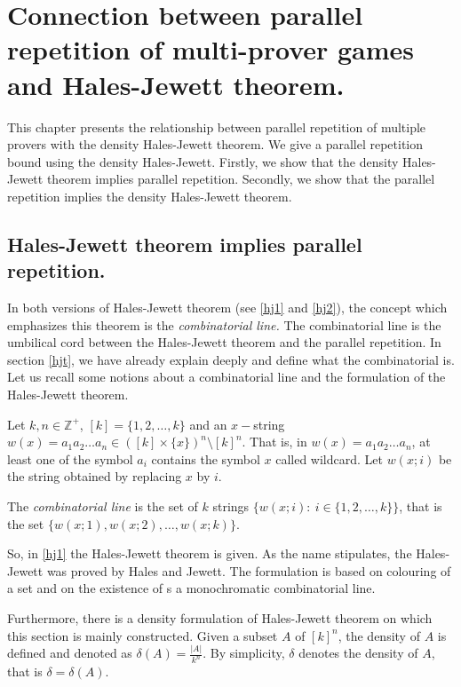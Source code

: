 

\chapter{Connection between parallel repetition of multi-prover games and  Hales-Jewett theorem.}

This chapter presents the relationship between parallel repetition of multiple provers with the density Hales-Jewett theorem. We give a parallel repetition bound using the density Hales-Jewett. Firstly, we show that the density Hales-Jewett theorem implies parallel repetition. Secondly, we show that the parallel repetition implies the density Hales-Jewett theorem.

\section{Hales-Jewett theorem implies parallel repetition.}

In both versions of Hales-Jewett theorem (see \eqref{hj1} and \eqref{hj2}), the concept which emphasizes this theorem is the \textit{combinatorial line.} The combinatorial line is the umbilical cord between the Hales-Jewett theorem and the parallel repetition. In section \eqref{hjt}, we have already explain deeply and define what the combinatorial is. Let us recall some notions about a combinatorial line and the formulation of the Hales-Jewett theorem.

Let $k, n\in \mathbb{Z}^+$, $[k]=\{1,2, \ldots,k\}$ and an $x-$string $w(x)=a_1a_2\ldots a_n \in ([k]\times\{x\})^n\setminus [k]^n.$ That is, in $w(x)=a_1a_2\ldots a_n$, at least one of the symbol   $a_i$ contains the symbol  $x$ called wildcard. Let $w(x;i)$ be the string obtained by replacing $x$ by $i$.

The \textit{combinatorial line} is the set of $k$ strings $\{w(x;i): \ i\in \{1,2,\ldots,k\} \}$, that is the set $\{w(x;1), w(x;2), \ldots, w(x;k)\}.$ 
 
So, in \eqref{hj1}  the Hales-Jewett theorem is given. As the name stipulates, the Hales-Jewett was proved by Hales and Jewett. The formulation is based on colouring of a set and on the existence of s a monochromatic combinatorial line.

Furthermore, there is a density formulation of Hales-Jewett theorem on which this section is mainly constructed. Given a subset $A$ of $[k]^n$, the density of $A$ is defined and denoted as $\delta(A)=\frac{|A|}{k^n}.$ By simplicity, $\delta$ denotes the density of $A$, that is $\delta=\delta(A).$

